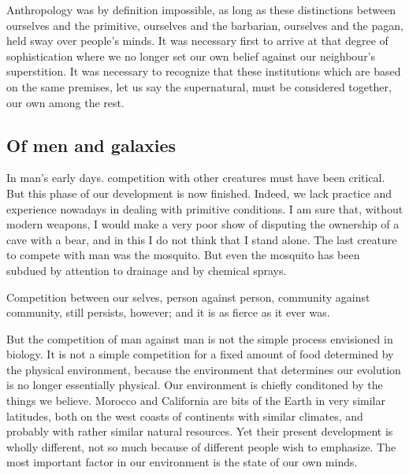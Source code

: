 \documentclass[11pt]{article}
\begin{document}
Anthropology was by definition impossible, as long as these distinctions between ourselves and the primitive, ourselves and the barbarian, ourselves and the pagan, held sway over people's minds. It was necessary first to arrive at that degree of sophistication where we no longer set our own belief against our neighbour's superstition. It was necessary to recognize that these institutions which are based on the same premises, let us say the supernatural, must be considered together, our own among the rest.
\subsection{Of men and galaxies}
\label{sec-2-45}

In man's early days. competition with other creatures must have been critical. But this phase of our development is now finished. Indeed, we lack practice and experience nowadays in dealing with primitive conditions. I am sure that, without modern weapons, I would make a very poor show of disputing the ownership of a cave with a bear, and in this I do not think that I stand alone. The last creature to compete with man was the mosquito. But even the mosquito has been subdued by attention to drainage and by chemical sprays.

Competition between our selves, person against person, community against community, still persists, however; and it is as fierce as it ever was.

But the competition of man against man is not the simple process envisioned in biology. It is not a simple competition for a fixed amount of food determined by the physical environment, because the environment that determines our evolution is no longer essentially physical. Our environment is chiefly conditoned by the things we believe. Morocco and California are bits of the Earth in very similar latitudes, both on the west coasts of continents with similar climates, and probably with rather similar natural resources. Yet their present development is wholly different, not so much because of different people wish to emphasize. The most important factor in our environment is the state of our own minds.
\end{document}
